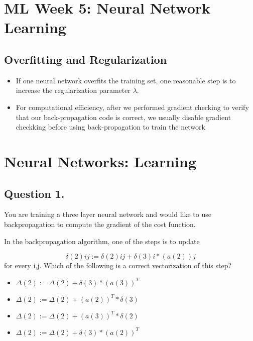 \documentclass[11pt]{article} %
\begin{document}

\section{ML Week 5:  Neural Network Learning}
\subsection*{Overfitting and Regularization}

\begin{itemize}
\item If one neural network overfits the training set, one reasonable step is to
increase the regularization parameter $\lambda$.
\item For computational efficiency, after we performed gradient checking to verify that our back-propagation 
code is correct, we usually disable gradient checkking before using back-propagation to train
the network
\end{itemize}




\section{Neural Networks: Learning}


\subsection*{ Question 1. }
You are training a three layer neural network and would like to use backpropagation to compute the gradient of the cost function. 

In the backpropagation algorithm, one of the steps is to update

\[ \delta(2)ij:=\delta(2)ij+\delta(3)i \ast (a(2))j \]
for every i,j. Which of the following is a correct vectorization of this step?

\begin{itemize}
	\item $\Delta(2) :=\Delta(2)+\delta(3) \ast (a(3))^T$
	
	\item $\Delta(2) :=\Delta(2)+(a(2))^T \ast \delta(3)$
	
	\item $\Delta(2) :=\Delta(2)+(a(3))^T \ast\delta(2)$
	
	\item $\Delta(2) :=\Delta(2)+\delta(3) \ast (a(2))^T$
\end{itemize}
\end{document}
